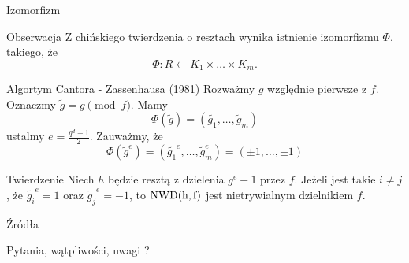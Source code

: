 \documentclass{beamer}
\newcommand{\NWD}{\rm{NWD}}
\begin{document}
\begin{frame}{Izomorfizm}
    \begin{alertblock}{Obserwacja}
    Z chińskiego twierdzenia o resztach wynika istnienie izomorfizmu $\Phi$, takiego, że
    $$ \Phi : R \leftarrow K_1 \times \ldots \times K_m.$$        
    \end{alertblock}
\end{frame}

\begin{frame}{Algortym Cantora - Zassenhausa (1981)}
    Rozważmy $g$ względnie pierwsze z $f$. Oznaczmy $\tilde{g} = g \pmod{f}$.
    Mamy $$ \Phi(\tilde{g}) = (\tilde{g_1}, \ldots, \tilde{g}_m)$$
    ustalmy $e = \frac{q^d - 1}{2}$. Zauważmy, że 
    $$ \Phi(\tilde{g}^e) = (\tilde{g_1}^e, \ldots, \tilde{g}_m^e) = (\pm 1, \ldots , \pm 1)$$
    \pause 
    \begin{block}{Twierdzenie}
        Niech $h$ będzie resztą z dzielenia $g^e -1$ przez $f$. Jeżeli jest takie $i \neq j$,
        że $\tilde{g_i}^e =1$ oraz $\tilde{g_j}^e = -1$, to $\NWD(h,f)$ jest nietrywialnym dzielnikiem $f$.  
    \end{block}
\end{frame}

\begin{frame}{Źródła}
    \printbibliography
\end{frame}

\begin{frame}
    \centering 
    \LARGE Pytania, wątpliwości, uwagi ? 
\end{frame}
\end{document}
